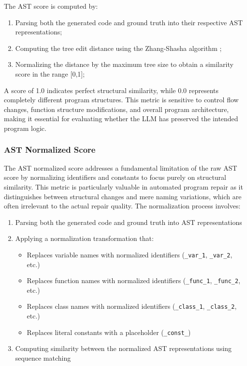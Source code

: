 The AST score is computed by:
\begin{enumerate}
    \item Parsing both the generated code and ground truth into their respective AST representations;
    \item Computing the tree edit distance using the Zhang-Shasha algorithm \cite{zhang1989simple};
    \item Normalizing the distance by the maximum tree size to obtain a similarity score in the range [0,1];
\end{enumerate}

A score of 1.0 indicates perfect structural similarity, while 0.0 represents completely different program structures. This metric is sensitive to control flow changes, function structure modifications, and overall program architecture, making it essential for evaluating whether the LLM has preserved the intended program logic.

\subsubsection{AST Normalized Score}
The AST normalized score addresses a fundamental limitation of the raw AST score by normalizing identifiers and constants to focus purely on structural similarity. This metric is particularly valuable in automated program repair as it distinguishes between structural changes and mere naming variations, which are often irrelevant to the actual repair quality.
The normalization process involves:
\begin{enumerate}
    \item Parsing both the generated code and ground truth into AST representations
    \item Applying a normalization transformation that:
        \begin{itemize}
            \item Replaces variable names with normalized identifiers (\texttt{\_var\_1}, \texttt{\_var\_2}, etc.)
            \item Replaces function names with normalized identifiers (\texttt{\_func\_1}, \texttt{\_func\_2}, etc.)
            \item Replaces class names with normalized identifiers (\texttt{\_class\_1}, \texttt{\_class\_2}, etc.)
            \item Replaces literal constants with a placeholder (\texttt{\_const\_})
        \end{itemize}
    \item Computing similarity between the normalized AST representations using sequence matching
\end{enumerate}

